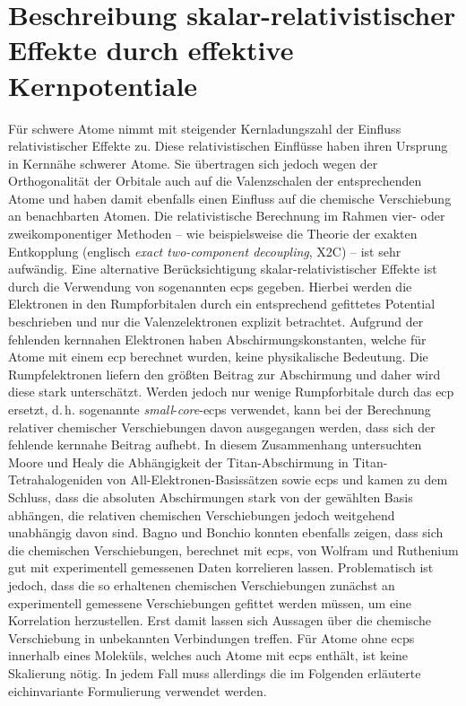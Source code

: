 \section{Beschreibung skalar-relativistischer Effekte durch effektive Kernpotentiale}\label{kap:ecps}
Für schwere Atome nimmt mit steigender Kernladungszahl der Einfluss relativistischer Effekte zu. Diese relativistischen Einflüsse haben ihren Ursprung in Kernnähe schwerer Atome. Sie übertragen sich jedoch wegen der Orthogonalität der Orbitale auch auf die Valenzschalen der entsprechenden Atome und haben damit ebenfalls einen Einfluss auf die chemische Verschiebung an benachbarten Atomen. Die relativistische Berechnung im Rahmen vier- oder zweikomponentiger Methoden -- wie beispielsweise die Theorie der exakten Entkopplung (englisch \textit{exact two-component decoupling}, X2C)\supercite{liu2010ideas,saue2011relativistic,peng2012exact} -- ist sehr aufwändig. Eine alternative Berücksichtigung skalar-relativistischer Effekte ist durch die Verwendung von sogenannten \acfp{ecp}\supercite{cundari1996effective,frenking2007pseudopotential} gegeben. Hierbei werden die Elektronen in den Rumpforbitalen durch ein entsprechend gefittetes Potential beschrieben und nur die Valenzelektronen explizit betrachtet. Aufgrund der fehlenden kernnahen Elektronen haben Abschirmungskonstanten, welche für Atome mit einem \ac{ecp} berechnet wurden, keine physikalische Bedeutung. Die Rumpfelektronen liefern den größten Beitrag zur Abschirmung und daher wird diese stark unterschätzt. Werden jedoch nur wenige Rumpforbitale durch das \ac{ecp} ersetzt, d.\,h. sogenannte \textit{small}-\textit{core}-\acp{ecp} verwendet, kann bei der Berechnung relativer chemischer Verschiebungen davon ausgegangen werden, dass sich der fehlende kernnahe Beitrag aufhebt.\supercite{van2012use} In diesem Zusammenhang untersuchten Moore und Healy\supercite{moore1995ab} die Abhängigkeit der Titan-Abschirmung in Titan-Tetrahalogeniden von All-Elektronen-Basissätzen sowie \acp{ecp} und kamen zu dem Schluss, dass die absoluten Abschirmungen stark von der gewählten Basis abhängen, die relativen chemischen Verschiebungen jedoch weitgehend unabhängig davon sind. Bagno und Bonchio konnten ebenfalls zeigen, dass sich die chemischen Verschiebungen, berechnet mit \acp{ecp}, von Wolfram\supercite{bagno2000effective} und Ruthenium\supercite{bagno2002dft} gut mit experimentell gemessenen Daten korrelieren lassen. Problematisch ist jedoch, dass die so erhaltenen chemischen Verschiebungen zunächst an experimentell gemessene Verschiebungen gefittet werden müssen, um eine Korrelation herzustellen. Erst damit lassen sich Aussagen über die chemische Verschiebung in unbekannten Verbindungen treffen. Für Atome ohne \acp{ecp} innerhalb eines Moleküls, welches auch Atome mit \acp{ecp} enthält, ist keine Skalierung nötig. In jedem Fall muss allerdings die im Folgenden erläuterte eichinvariante Formulierung verwendet werden.
\vfill
\newpage
